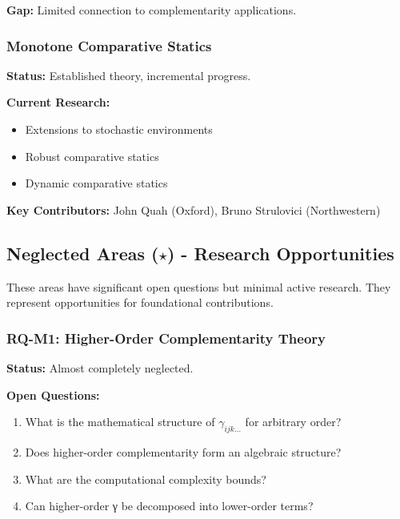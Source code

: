 \textbf{Gap:} Limited connection to complementarity applications.

\subsubsection{Monotone Comparative Statics}

\textbf{Status:} Established theory, incremental progress.

\textbf{Current Research:}
\begin{itemize}[noitemsep]
    \item Extensions to stochastic environments
    \item Robust comparative statics
    \item Dynamic comparative statics
\end{itemize}

\textbf{Key Contributors:} John Quah (Oxford), Bruno Strulovici (Northwestern)

\subsection{Neglected Areas ($\star$) - Research Opportunities}

\begin{tcolorbox}[colback=red!5!white,colframe=red!75!black,title=\textbf{Schattendasein: Wissenschaftlich vernachlässigte Gebiete}]
These areas have significant open questions but minimal active research. They represent opportunities for foundational contributions.
\end{tcolorbox}

\subsubsection{RQ-M1: Higher-Order Complementarity Theory}

\textbf{Status:} Almost completely neglected.

\textbf{Open Questions:}
\begin{enumerate}[noitemsep]
    \item What is the mathematical structure of $\gamma_{ijk\ldots}$ for arbitrary order?
    \item Does higher-order complementarity form an algebraic structure?
    \item What are the computational complexity bounds?
    \item Can higher-order γ be decomposed into lower-order terms?
\end{enumerate}

